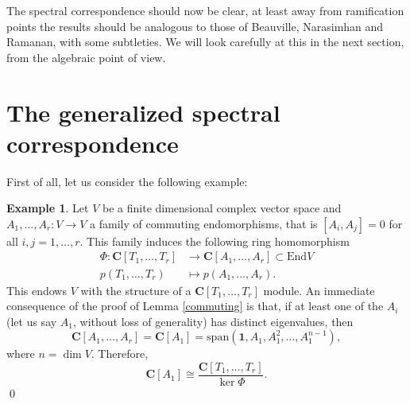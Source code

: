 \documentclass[12pt,a4paper]{book}
\theoremstyle{definition} \newtheorem{defn}[thm]{Definition}
\theoremstyle{definition} \newtheorem{ejemplo}[thm]{Example}
\theoremstyle{remark} \newtheorem{rem}[thm]{Remark}
\def\CC{\mathbf{C}}
\def\id{\mathbf{1}}
\def\End{\mathrm{End}}
\begin{document}
 The spectral correspondence should now be clear, at least away from ramification points the results should be analogous to those of Beauville, Narasimhan and Ramanan, with some subtleties. We will look carefully at this in the next section, from the algebraic point of view.

 \section{The generalized spectral correspondence}
 First of all, let us consider the following example:
 \begin{ejemplo}
   Let $V$ be a finite dimensional complex vector space and $A_1,\dots,A_r: V\rightarrow V$ a family of commuting endomorphisms, that is $[A_i,A_j]=0$ for all $i,j=1,\dots,r$. This family induces the following ring homomorphism
   \begin{align*}
     \Phi:\CC[T_1,\dots,T_r]&\longrightarrow \CC[A_1,\dots,A_r] \subset \End V\\ 
       p(T_1,\dots,T_r) &\longmapsto p(A_1,\dots,A_r) .
     \end{align*}
     This endows $V$ with the structure of a $\CC[T_1,\dots,T_r]$ module.
     An immediate consequence of the proof of Lemma \ref{commuting} is that, if at least one of the $A_i$ (let us say $A_1$, without loss of generality) has distinct eigenvalues, then $$\CC[A_1,\dots,A_r]=\CC[A_1]= \mathrm{span}(\id,A_1,A_1^2,\dots,A_1^{n-1}),$$ where $n=\dim V$. Therefore,
     \begin{equation*}
       \CC[A_1] \cong \frac{\CC[T_1,\dots,T_r]}{\ker \Phi}.
     \end{equation*}
     \qed
 \end{ejemplo}
\end{document}
